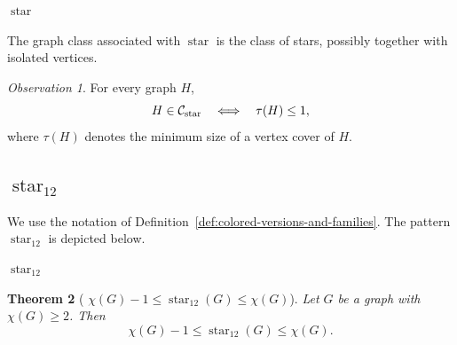 \documentclass[12pt]{article}
\theoremstyle{plain}
\newtheorem{theorem}{Theorem}[section]
\theoremstyle{definition}
\theoremstyle{remark}
\newtheorem{observation}[theorem]{Observation}
\theoremstyle{definition}
\newcommand{\starlabel}{\mathrm{star}}
\DeclareRobustCommand{\starname}{%
  \ensuremath{\mathop{\starlabel}\nolimits}%
}
\DeclareRobustCommand{\starparam}[1]{%
  \ensuremath{\mathop{\starlabel}\nolimits_{#1}}%
}
\begin{document}
\begin{center}

\smallskip
\(\starname\)
\end{center}

The graph class associated with \(\starname\) is the class of stars,
possibly together with isolated vertices.

\begin{observation}
For every graph \(H\),
\[
H\in\mathcal C_{\starname}
\quad\Longleftrightarrow\quad
\tau(H)\le 1,
\]
where \(\tau(H)\) denotes the minimum size of a vertex cover of \(H\).
\end{observation}




\subsection{\texorpdfstring{\(\starparam{12}\)}{star12}}
\label{subsec:star12}

We use the notation of
Definition~\ref{def:colored-versions-and-families}.
The pattern \(\starparam{12}\) is depicted below.

\begin{center}

\smallskip
\(\starparam{12}\)
\end{center}



\begin{theorem}[
\texorpdfstring{\(\chi(G)-1\le \starparam{12}(G)\le \chi(G)\)}
{Bounds for star12}
]
\label{thm:star12-bounds}
Let \(G\) be a graph with \(\chi(G)\ge 2\). Then
\[
\chi(G)-1
\le
\starparam{12}(G)
\le
\chi(G).
\]
\end{theorem}
\end{document}
